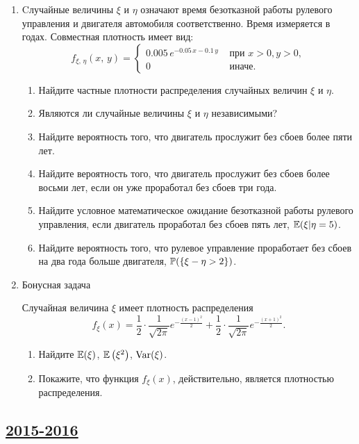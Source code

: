 \begin{enumerate}
\item
Cлучайные величины $\xi$ и $\eta$ означают время безотказной работы рулевого управления и двигателя автомобиля соответственно. Время измеряется в годах. Совместная плотность имеет вид:
\[
f_{\xi, \,\eta}(x,\,y) =
\begin{cases}
0.005\,e^{-0.05\,x-0.1\,y} & \text{ при } x > 0, y > 0, \\
0                    & \text{ иначе.}
\end{cases}
\]

\begin{enumerate}
  \item Найдите частные плотности распределения случайных величин $\xi$ и $\eta$.
  \item Являются ли случайные величины $\xi$ и $\eta$ независимыми?
  \item Найдите вероятность того, что двигатель прослужит без сбоев более пяти лет.
  \item Найдите вероятность того, что двигатель прослужит без сбоев более восьми лет, если он уже проработал без сбоев три года.
  \item Найдите условное математическое ожидание безотказной работы рулевого управления, если двигатель проработал без сбоев пять лет,  $\E(\xi | \eta = 5)$.
  \item Найдите вероятность того, что рулевое управление проработает без сбоев на два года больше двигателя,  $\P(\{\xi - \eta > 2\})$.
\end{enumerate}

\item Бонусная задача

Случайная величина $\xi$ имеет плотность распределения
\[
    f_{\xi}(x) = \frac{1}{2} \cdot \frac{1}{\sqrt{2\pi}}e^{-\frac{(x-1)^2}{2}} + \frac{1}{2} \cdot \frac{1}{\sqrt{2\pi}}e^{-\frac{(x+1)^2}{2}} \text{.}
\]

\begin{enumerate}
\item Найдите $\E(\xi)$, $\E\left(\xi^2\right)$, $\Var(\xi)$.
\item Покажите, что функция $f_{\xi}(x)$, действительно, является плотностью распределения.
\end{enumerate}
\end{enumerate}


\newpage
\subsection[2015-2016]{\hyperref[sec:sol_kr_02_2015_2016]{2015-2016}}
\label{sec:kr_02_2015_2016}



